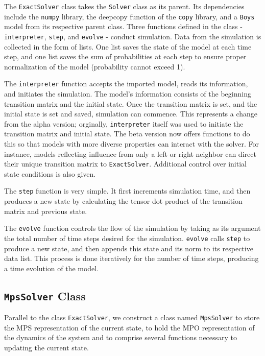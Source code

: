 \documentclass[english]{article}
\begin{document}
The \texttt{ExactSolver} class takes the \texttt{Solver} class as its parent. Its dependencies include the \texttt{numpy} library, the deepcopy function of the \texttt{copy} library, and a \texttt{Boys} model from its respective parent class. Three functions defined in the class - \texttt{interpreter}, \texttt{step}, and \texttt{evolve} - conduct simulation. Data from the simulation is collected in the form of lists. One list saves the state of the model at each time step, and one list saves the sum of probabilities at each step to ensure proper normalization of the model (probability cannot exceed 1).

The \texttt{interpreter} function accepts the imported model, reads its information, and initiates the simulation. The model's information consists of the beginning transition matrix and the initial state. Once the transition matrix is set, and the initial state is set and saved, simulation can commence. This represents a change from the alpha version; orginally, \texttt{interpreter} itself was used to initiate the transition matrix and initial state. The beta version now offers functions to do this so that models with more diverse properties can interact with the solver. For instance, models reflecting influence from only a left or right neighbor can direct their unique transition matrix to \texttt{ExactSolver}. Additional control over initial state conditions is also given.

The \texttt{step} function is very simple. It first increments simulation time, and then produces a new state by calculating the tensor dot product of the transition matrix and previous state.

The \texttt{evolve} function controls the flow of the simulation by taking as its argument the total number of time steps desired for the simulation. \texttt{evolve} calls \texttt{step} to produce a new state, and then appends this state and its norm to its respective data list. This process is done iteratively for the number of time steps, producing a time evolution of the model. 


\subsection{\texttt{MpsSolver} Class}
Parallel to the class \texttt{ExactSolver}, we construct a class named \texttt{MpsSolver} to store the MPS representation of the current state, to hold the MPO representation of the dynamics of the system and to comprise several functions necessary to updating the current state. 
\end{document}
